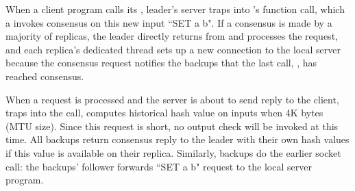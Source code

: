 When a client program calls its \send, leader's server traps into \xxx's \recv 
function call, which a invokes consensus on this new input ``SET a b". If 
a consensus is made by a majority of replicas, the leader directly returns from 
\recv and processes the request, and each replica's dedicated thread sets up 
a new connection to the local server because the \recv consensus request 
notifies the backups that the last call, \accept, has reached consensus.


When a request is processed and the server is about to send reply to the 
client, \xxx traps into the \send call, computes historical hash value on 
inputs when 4K bytes (MTU size). Since this request is short, no output check 
will be invoked at this time. All backups return consensus reply to the leader 
with their own hash values if this value is available on their replica. 
Similarly, backups do the earlier socket call: the backups' follower forwards 
``SET a b" request to the local server program.



